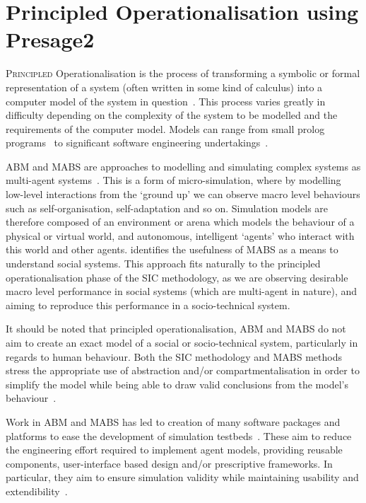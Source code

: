 \acresetall
\chapter{Principled Operationalisation using Presage2}\label{ch:presage}

\lettrine[lines=3]{P}{rincipled} Operationalisation is the process of transforming a symbolic or formal representation of a system (often written in some kind of calculus) into a computer model of the system in question~\citep{Jones2013}. This process varies greatly in difficulty depending on the complexity of the system to be modelled and the requirements of the computer model.  Models can range from small prolog programs~\citep{Pitt2005a} to significant software engineering undertakings~\citep{Timm2005,Oguara2005}.

\ac{ABM} and \ac{MABS} are approaches to modelling and simulating complex systems as multi-agent systems~\citep{Macal2010,Moss2001}.
This is a form of micro-simulation, where by modelling low-level interactions from the `ground up' we can observe macro level behaviours such as self-organisation, self-adaptation and so on.
Simulation models are therefore composed of an environment or arena which models the behaviour of a physical or virtual world, and autonomous, intelligent `agents' who interact with this world and other agents. 
\citet{Axelrod1997} identifies the usefulness of \ac{MABS} as a means to understand social systems. 
This approach fits naturally to the principled operationalisation phase of the \ac{SIC} methodology, as we are observing desirable macro level performance in social systems (which are multi-agent in nature), and aiming to reproduce this performance in a socio-technical system. 

It should be noted that principled operationalisation, \ac{ABM} and \ac{MABS} do not aim to create an exact model of a social or socio-technical system, particularly in regards to human behaviour. Both the \ac{SIC} methodology and \ac{MABS} methods stress the appropriate use of abstraction and/or compartmentalisation in order to simplify the model while being able to draw valid conclusions from the model's behaviour~\citep{Edmonds2001}.

Work in \ac{ABM} and \ac{MABS} has led to creation of many software packages and platforms to ease the development of simulation testbeds~\citep{CynthiaNikolaiandGregoryMadey2009}. These aim to reduce the engineering effort required to implement agent models, providing reusable components, user-interface based design and/or prescriptive frameworks. In particular, they aim to ensure simulation validity while maintaining usability and extendibility~\citep{Axelrod1997}.

